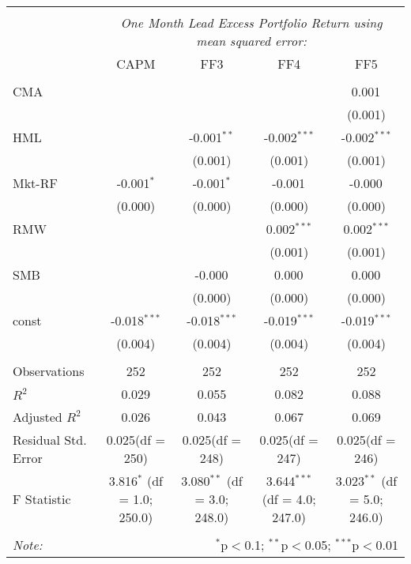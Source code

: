 \begin{table}[!htbp] \centering
\begin{tabular}{@{\extracolsep{5pt}}lcccc}
\\[-1.8ex]\hline
\hline \\[-1.8ex]
& \multicolumn{4}{c}{\textit{One Month Lead Excess Portfolio Return using mean squared error:}} \
\cr \cline{4-5}
\\[-1.8ex] & CAPM & FF3 & FF4 & FF5 \\
\hline \\[-1.8ex]
 CMA & & & & 0.001$^{}$ \\
  & & & & (0.001) \\
 HML & & -0.001$^{**}$ & -0.002$^{***}$ & -0.002$^{***}$ \\
  & & (0.001) & (0.001) & (0.001) \\
 Mkt-RF & -0.001$^{*}$ & -0.001$^{*}$ & -0.001$^{}$ & -0.000$^{}$ \\
  & (0.000) & (0.000) & (0.000) & (0.000) \\
 RMW & & & 0.002$^{***}$ & 0.002$^{***}$ \\
  & & & (0.001) & (0.001) \\
 SMB & & -0.000$^{}$ & 0.000$^{}$ & 0.000$^{}$ \\
  & & (0.000) & (0.000) & (0.000) \\
 const & -0.018$^{***}$ & -0.018$^{***}$ & -0.019$^{***}$ & -0.019$^{***}$ \\
  & (0.004) & (0.004) & (0.004) & (0.004) \\
\hline \\[-1.8ex]
 Observations & 252 & 252 & 252 & 252 \\
 $R^2$ & 0.029 & 0.055 & 0.082 & 0.088 \\
 Adjusted $R^2$ & 0.026 & 0.043 & 0.067 & 0.069 \\
 Residual Std. Error & 0.025(df = 250) & 0.025(df = 248) & 0.025(df = 247) & 0.025(df = 246)  \\
 F Statistic & 3.816$^{*}$ (df = 1.0; 250.0) & 3.080$^{**}$ (df = 3.0; 248.0) & 3.644$^{***}$ (df = 4.0; 247.0) & 3.023$^{**}$ (df = 5.0; 246.0) \\
\hline
\hline \\[-1.8ex]
\textit{Note:} & \multicolumn{4}{r}{$^{*}$p$<$0.1; $^{**}$p$<$0.05; $^{***}$p$<$0.01} \\
\end{tabular}
\end{table}
